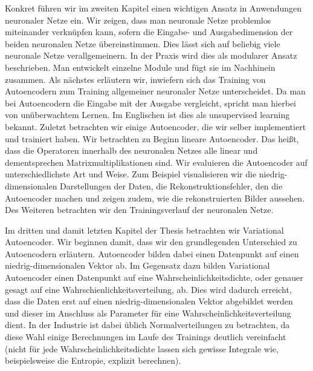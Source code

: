 \documentclass[11pt, twoside, a4paper]{book}
\theoremstyle{plain}
\theoremstyle{definition}
\theoremstyle{plain}
\begin{document}
Konkret führen wir im zweiten Kapitel einen wichtigen Ansatz in Anwendungen neuronaler Netze ein. Wir zeigen, dass man neuronale Netze problemlos miteinander verknüpfen kann, sofern die Eingabe- und Ausgabedimension der beiden neuronalen Netze übereinstimmen. Dies lässt sich auf beliebig viele neuronale Netze verallgemeinern. In der Praxis wird dies als \glqq modularer Ansatz\grqq{} beschrieben. Man entwickelt einzelne Module und fügt sie im Nachhinein zusammen.
Als nächstes erläutern wir, inwiefern sich das Training von Autoencodern zum Training allgemeiner neuronaler Netze unterscheidet. Da man bei Autoencodern die Eingabe mit der Ausgabe vergleicht, spricht man hierbei von unüberwachtem Lernen. Im Englischen ist dies als \glqq unsupervised learning\grqq{} bekannt. Zuletzt betrachten wir einige Autoencoder, die wir selber implementiert und trainiert haben. Wir betrachten zu Beginn lineare Autoencoder. Das heißt, dass die Operatoren innerhalb des neuronalen Netzes alle linear und dementsprechen Matrixmultiplikationen sind. Wir evaluieren die Autoencoder auf unterschiedlichste Art und Weise. Zum Beispiel visualisieren wir die niedrig-dimensionalen Darstellungen der Daten, die Rekonstruktionsfehler, den die Autoencoder machen und zeigen zudem, wie die rekonstruierten Bilder aussehen. Des Weiteren betrachten wir den Trainingsverlauf der neuronalen Netze.

Im dritten und damit letzten Kapitel der Thesis betrachten wir Variational Autoencoder. Wir beginnen damit, dass wir den grundlegenden Unterschied zu Autoencodern erläutern. Autoencoder bilden dabei einen Datenpunkt auf einen niedrig-dimensionalen Vektor ab. Im Gegensatz dazu bilden Variational Autoencoder einen Datenpunkt auf eine Wahrscheinlichkeitsdichte, oder genauer gesagt auf eine Wahrschienlichkeitsverteilung, ab. Dies wird dadurch erreicht, dass die Daten erst auf einen niedrig-dimensionalen Vektor abgebildet werden und dieser im Anschluss als Parameter für eine Wahrscheinlichkeitsverteilung dient. In der Industrie ist dabei üblich Normalverteilungen zu betrachten, da diese Wahl einige Berechnungen im Laufe des Trainings deutlich vereinfacht (nicht für jede Wahrscheinlichkeitsdichte lassen sich gewisse Integrale wie, beispielsweise die Entropie, explizit berechnen).
\end{document}
